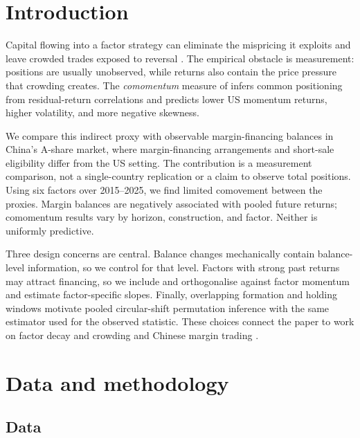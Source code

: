 \documentclass[final,1p,authoryear]{elsarticle}
\begin{document}
\section{Introduction}

\noindent Capital flowing into a factor strategy can eliminate the mispricing it exploits and leave
crowded trades exposed to reversal \citep{shleifer1997limits,delong1990noise,stein2009presidential,barberis2003style}.
The empirical obstacle is measurement: positions are usually unobserved, while returns also
contain the price pressure that crowding creates. The \emph{comomentum} measure of
\citet{lou2022comomentum} infers common positioning from residual-return correlations and predicts
lower US momentum returns, higher volatility, and more negative skewness.

We compare this indirect proxy with observable margin-financing balances in China's A-share
market, where margin-financing arrangements and short-sale eligibility differ from the US setting.
The contribution is a measurement comparison, not a single-country replication or a claim to
observe total positions. Using six factors over 2015--2025, we find limited comovement between
the proxies. Margin balances are negatively associated with pooled future returns; comomentum
results vary by horizon, construction, and factor. Neither is uniformly predictive.

Three design concerns are central. Balance changes mechanically contain balance-level
information, so we control for that level. Factors with strong past returns may attract
financing, so we include and orthogonalise against factor momentum and estimate factor-specific
slopes. Finally, overlapping formation and holding windows motivate pooled circular-shift
permutation inference with the same estimator used for the observed statistic. These choices
connect the paper to work on factor decay and crowding \citep{mclean2016does,beck2016will,
lou2022comomentum} and Chinese margin trading \citep{bian2026drivers,xing2026pmo}.

\section{Data and methodology}

\subsection{Data}
\end{document}
